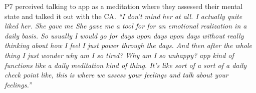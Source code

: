         P7 perceived talking to \acl{app} as a meditation where they assessed their mental state and talked it out with the \ac{CA}.   
            \textit{``I don't mind her at all. I actually quite liked her. She gave me She gave me a tool for for an emotional realization in a daily basis. So usually I would go for days upon days upon days without really thinking about how I feel I just power through the days. And then after the whole thing I just wonder why am I so tired? Why am I so unhappy?
            \acl{app} kind of functions like a daily meditation kind of thing. It's like sort of a sort of a daily check point like, this is where we assess your feelings and talk about your feelings.'' 
            }
